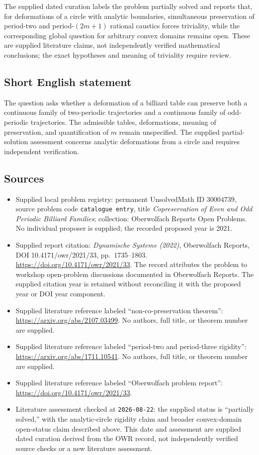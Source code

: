 \documentclass[11pt]{article}
\begin{document}
The supplied dated curation labels the problem partially solved and reports that, for deformations of a circle with analytic boundaries, simultaneous preservation of period-two and period-\((2m+1)\) rational caustics forces triviality, while the corresponding global question for arbitrary convex domains remains open. These are supplied literature claims, not independently verified mathematical conclusions; the exact hypotheses and meaning of triviality require review.
\subsection{Short English statement}
The question asks whether a deformation of a billiard table can preserve both a continuous family of two-periodic trajectories and a continuous family of odd-periodic trajectories. The admissible tables, deformations, meaning of preservation, and quantification of \(m\) remain unspecified. The supplied partial-solution assessment concerns analytic deformations from a circle and requires independent verification.
\subsection{Sources}
\begin{itemize}
\item Supplied local problem registry: permanent UnsolvedMath ID \(30004739\), source problem code \texttt{catalogue entry}, title \emph{Copreservation of Even and Odd Periodic Billiard Families}; collection: Oberwolfach Reports Open Problems. No individual proposer is supplied; the recorded proposed year is 2021.
\item Supplied report citation: \emph{Dynamische Systeme (2022)}, Oberwolfach Reports, DOI 10.4171/owr/2021/33, pp.\ 1735--1803. \url{https://doi.org/10.4171/owr/2021/33}. The record attributes the problem to workshop open-problem discussions documented in Oberwolfach Reports. The supplied citation year is retained without reconciling it with the proposed year or DOI year component.
\item Supplied literature reference labeled ``non-co-preservation theorem'': \url{https://arxiv.org/abs/2107.03499}. No authors, full title, or theorem number are supplied.
\item Supplied literature reference labeled ``period-two and period-three rigidity'': \url{https://arxiv.org/abs/1711.10541}. No authors, full title, or theorem number are supplied.
\item Supplied literature reference labeled ``Oberwolfach problem report'': \url{https://doi.org/10.4171/owr/2021/33}.
\item Literature assessment checked at \texttt{2026-08-22}: the supplied status is ``partially solved,'' with the analytic-circle rigidity claim and broader convex-domain open-status claim described above. This date and assessment are supplied dated curation derived from the OWR record, not independently verified source checks or a new literature assessment.
\end{itemize}
\end{document}
